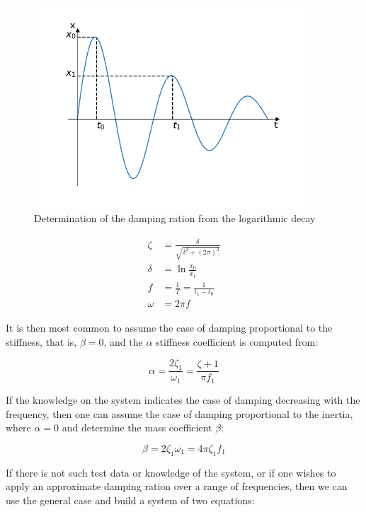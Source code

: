 \documentclass[10pt,b5paper,titlepage]{book}
\newenvironment{eqarray}
{
    \begin{eqnarray}
        \begin{aligned}
}
{
        \end{aligned}
    \end{eqnarray}
}
\begin{document}
\begin{figure}[ht]
    \centering
    \includegraphics[width=0.90\textwidth]{img/Logarithmic_Decay_Damping_Ratio.png}
    \caption{Determination of the damping ration from the logarithmic decay}
    \label{fig:logarithmic-decay-damping-ratio-png}
\end{figure}

\begin{eqarray}
    \zeta &= \frac{\delta}{\sqrt{\delta^2 + (2 \pi)^2}}\\
    \delta &= \ln{\frac{x_0}{x_1}}\\
    f &= \frac{1}{T} = \frac{1}{t_1 - t_0}\\
    \omega &= 2 \pi f
\end{eqarray}

It is then most common to assume the case of damping proportional to the stiffness,
that is, $ \beta = 0 $, and the $ \alpha $ stiffness coefficient is computed from:

\begin{equation}
    \alpha = \frac{2 \zeta_1}{\omega_1} = \frac{\zeta+1}{\pi f_1}
\end{equation}

If the knowledge on the system indicates the case of damping decreasing with the
frequency, then one can assume the case of damping proportional to the inertia,
where $ \alpha = 0 $ and determine the mass coefficient $ \beta $:

\begin{equation}
    \beta = 2 \zeta_1 \omega_1 = 4 \pi \zeta_1 f_1
\end{equation}

If there is not such test data or knowledge of the system, or if one wishes to apply
an approximate damping ration over a range of frequencies, then we can use the
general case and build a system of two equations:
\end{document}
